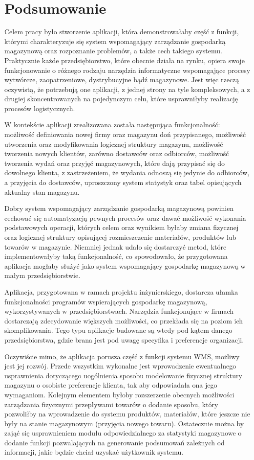 \chapter{Podsumowanie}
\label{c7:c7}
	Celem pracy było stworzenie aplikacji, która demonstrowałaby część z funkcji, którymi charakteryzuje
	się system wspomagający zarządzanie gospodarką magazynową oraz rozpoznanie problemów, a także
	cech takiego systemu. Praktycznie każde przedsiębiorstwo, które obecnie działa na rynku, opiera swoje funkcjonowanie o
	różnego rodzaju narzędzia informatyczne wspomagające procesy wytwórcze, zaopatrzeniowe, dystrybucyjne
	bądź magazynowe. Jest więc rzeczą oczywistą, że potrzebują one aplikacji, z jednej strony na tyle kompleksowych, a
	z drugiej skoncentrowanych na pojedynczym celu, które usprawniłyby realizację procesów logistycznych.
	
	W kontekście aplikacji zrealizowana została następująca funkcjonalność: 
	możliwość defi\-niowania nowej firmy oraz magazynu doń przypisanego,
	możliwość utworzenia oraz modyfikowania logicznej struktury magazynu,
	możliwość tworzenia nowych klientów, zarówno dostawców oraz odbiorców,
	możliwość tworzenia wydań oraz przyjęć magazynowych, które dają przypisać się do dowolnego klienta,
	z zastrzeżeniem, że wydania odnoszą się jedynie do odbiorców, a przyjęcia do dostawców,
	uproszczony system statystyk oraz tabel opisujących aktualny stan magazynu. 	

	Dobry system wspomagający zarządzanie gospodarką magazynową powinien
	cechować się automatyzacją pewnych procesów oraz dawać możliwość wykonania
	podstawowych operacji, których celem oraz wynikiem byłaby zmiana fizycznej oraz logicznej struktury
	opisującej rozmieszczenie materiałów, produktów lub towarów w magazynie.
	Niemniej jednak udało się dostarczyć metod, które implementowałyby taką funkcjonalność, co spowodowało,
	że przygotowana aplikacja mogłaby służyć jako system wspomagający gospodarkę magazynową w 
	małym przedsiębiorstwie.
	
	Aplikacja, przygotowana w ramach projektu inżynierskiego, dostarcza ułamka funkcjonalności
	programów wspierających gospodarkę magazynową, wykorzystywanych w przedsiębiorstwach. 
	Narzędzia funkcjonujące w firmach dostarczają zdecydowanie większych możliwości, co przekłada się na poziom
	ich skomplikowania. Tego typu aplikacje budowane są wtedy pod kątem danego przedsiębiorstwa, gdzie brana jest
	pod uwagę specyfika i preferencje organizacji.
	
	Oczywiście mimo, że aplikacja porusza część z funkcji systemu WMS, możliwy jest jej rozwój. Przede wszystkim
	wykonalne jest wprowadzenie ewentualnego usprawnienia dotyczącego uogólnienia sposobu modelowanie fizycznej 
	struktury magazynu o osobiste prefe\-rencje klienta, tak aby odpowiadała ona jego wymaganiom. 
	Kolejnym elementem byłoby rozszerzenie obecnych	możliwości zarządzania fizycznymi przepływami towarów o dodanie sposobu, który pozwoliłby
	na wprowadzenie do systemu produktów, materiałów, które jeszcze nie były na stanie magazynowym (przyjęcia nowego towaru).
	Ostatecznie można by zająć się usprawnieniem modułu odpowiedzialnego za statystyki magazynowe o dodanie funkcji pozwalających
	na generowanie podsumowań zależnych od informacji, jakie będzie chciał uzyskać użytkownik systemu. 